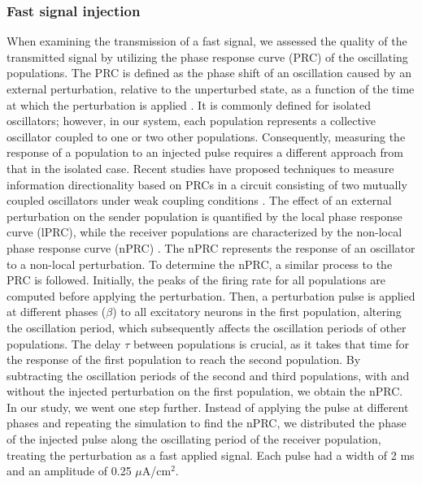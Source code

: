 \documentclass[../main.tex]{subfiles}
\begin{document}
\subsubsection{Fast signal injection}
When examining the transmission of a fast signal, we assessed the quality of the transmitted signal by utilizing the phase response curve (PRC) of the oscillating populations.
The PRC is defined as the phase shift of an oscillation caused by an external perturbation, relative to the unperturbed state, as a function of the time at which the perturbation is applied \citep{ko_phase-response_2009}.
It is commonly defined for isolated oscillators; however, in our system, each population represents a collective oscillator coupled to one or two other populations.
Consequently, measuring the response of a population to an injected pulse requires a different approach from that in the isolated case.
Recent studies have proposed techniques to measure information directionality based on PRCs in a circuit consisting of two mutually coupled oscillators under weak coupling conditions \citep{dumont_macroscopic_2019}.
The effect of an external perturbation on the sender population is quantified by the local phase response curve (lPRC), while the receiver populations are characterized by the non-local phase response curve (nPRC) 
\citep{schultheiss2011phase,pariz_transmission_2021}.
The nPRC represents the response of an oscillator to a non-local perturbation.
To determine the nPRC, a similar process to the PRC is followed.
Initially, the peaks of the firing rate for all populations are computed before applying the perturbation.
Then, a perturbation pulse is applied at different phases ($\beta$) to all excitatory neurons in the first population, altering the oscillation period, which subsequently affects the oscillation periods of other populations.
The delay $\tau$ between populations is crucial, as it takes that time for the response of the first population to reach the second population.
By subtracting the oscillation periods of the second and third populations, with and without the injected perturbation on the first population, we obtain the nPRC.
In our study, we went one step further.
Instead of applying the pulse at different phases and repeating the simulation to find the nPRC, we distributed the phase of the injected pulse along the oscillating period of the receiver population, treating the perturbation as a fast applied signal.
Each pulse had a width of 2 ms and an amplitude of 0.25 $\mu$A/cm$^2$.
\end{document}
